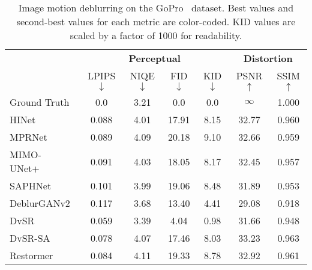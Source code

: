\begin{table}[ht]
\small
\setlength{\tabcolsep}{1pt}
\centering
\caption{Image motion deblurring on the GoPro~\citep{nah2017deep} dataset. \colorbox{red!15}{Best values} and \colorbox{blue!15}{second-best values} for each metric are color-coded. KID values are scaled by a factor of 1000 for readability.}
\label{table:gopro_results}
\begin{tabular}{lcccccc}
\toprule

& \multicolumn{4}{c}{\textbf{Perceptual}}
& \multicolumn{2}{c}{\textbf{Distortion}} \\

\cmidrule(lr){2-5} \cmidrule(lr){6-7}

& LPIPS$\downarrow$
& NIQE$\downarrow$
& FID$\downarrow$
& KID$\downarrow$
& PSNR$\uparrow$
& SSIM$\uparrow$ \\

\midrule

Ground Truth
& 0.0   & 3.21         & 0.0       & 0.0 & $\infty$  & 1.000 \\

\cmidrule{1-7}

HINet~\citep{chen2021hinet} 
& 0.088    & 4.01     & 17.91     & 8.15 & 32.77    & 0.960 \\

MPRNet~\citep{zamir2021multi} 
& 0.089    & 4.09     & 20.18     & 9.10 & 32.66     & 0.959  \\

MIMO-UNet+~\citep{cho2021rethinking} 
& 0.091    & 4.03     & 18.05     & 8.17 & 32.45     & 0.957  \\

SAPHNet~\citep{suin2020spatially}
& 0.101    & 3.99     & 19.06     & 8.48 & 31.89    & 0.953 \\

DeblurGANv2~\citep{kupyn2019deblurgan}
& 0.117    & 3.68     & 13.40     & 4.41 & 29.08    & 0.918 \\

DvSR~\citep{whang2022deblurring}
& \colorbox{blue!15}{0.059}  & \colorbox{blue!15}{3.39}   & \colorbox{blue!15}{4.04} & \colorbox{blue!15}{0.98} & 31.66    & 0.948 \\

DvSR-SA~\citep{whang2022deblurring}
& 0.078  & 4.07 & 17.46    & 8.03 & \colorbox{blue!15}{33.23}  & \colorbox{blue!15}{0.963} \\

Restormer~\citep{zamir2022restormer}	
& 0.084	& 4.11 	& 19.33	& 8.78	& 32.92	& 0.961 \\				


\end{tabular}
\end{table}
